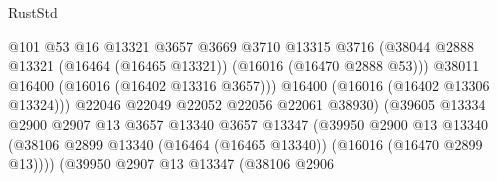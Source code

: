 \begin{lexlean}{RustStd}
\begin{coremodule}
                                              @101
                                              @53
                                              @16
                                              @13321
                                              @3657
                                              @3669
                                              @3710
                                              @13315
                                              @3716
                                              (@38044
                                                @2888
                                                @13321
                                                (@16464 (@16465 @13321))
                                                (@16016 (@16470 @2888 @53)))
                                              @38011
                                              @16400
                                              (@16016 (@16402 @13316 @3657)))
                                            @16400
                                            (@16016 (@16402 @13306 @13324)))
                                          @22046
                                          @22049
                                          @22052
                                          @22056
                                          @22061
                                          @38930)
                                        (@39605
                                          @13334
                                          @2900
                                          @2907
                                          @13
                                          @3657
                                          @13340
                                          @3657
                                          @13347
                                          (@39950
                                            @2900
                                            @13
                                            @13340
                                            (@38106
                                              @2899
                                              @13340
                                              (@16464 (@16465 @13340))
                                              (@16016 (@16470 @2899 @13))))
                                          (@39950
                                            @2907
                                            @13
                                            @13347
                                            (@38106
                                              @2906

\end{coremodule}
\end{lexlean}
